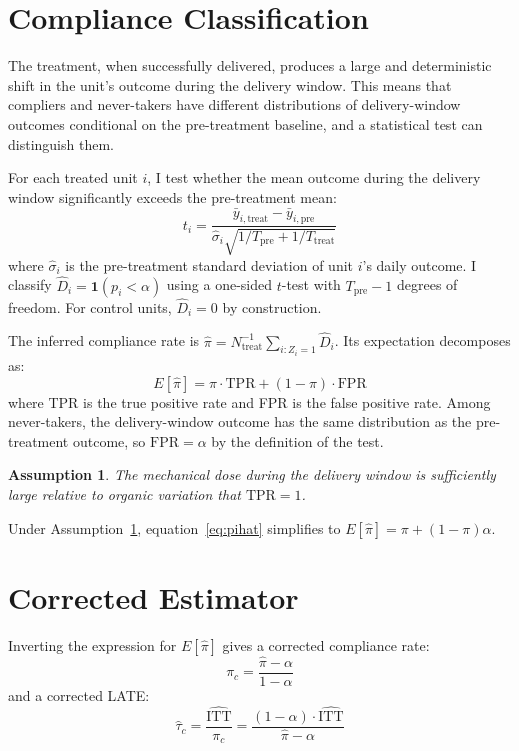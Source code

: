 \documentclass[12pt]{article}
\newtheorem{assumption}{Assumption}
\begin{document}
\section{Compliance Classification}

The treatment, when successfully delivered, produces a large and deterministic shift in the unit's outcome during the delivery window. This means that compliers and never-takers have different distributions of delivery-window outcomes conditional on the pre-treatment baseline, and a statistical test can distinguish them.

For each treated unit $i$, I test whether the mean outcome during the delivery window significantly exceeds the pre-treatment mean:
\begin{equation}\label{eq:tstat}
t_i = \frac{\bar{y}_{i,\text{treat}} - \bar{y}_{i,\text{pre}}}{\hat{\sigma}_i \sqrt{1/T_{\text{pre}} + 1/T_{\text{treat}}}}
\end{equation}
where $\hat{\sigma}_i$ is the pre-treatment standard deviation of unit $i$'s daily outcome. I classify $\hat{D}_i = \mathbf{1}(p_i < \alpha)$ using a one-sided $t$-test with $T_{\text{pre}} - 1$ degrees of freedom. For control units, $\hat{D}_i = 0$ by construction.

The inferred compliance rate is $\hat{\pi} = N_{\text{treat}}^{-1} \sum_{i: Z_i=1} \hat{D}_i$. Its expectation decomposes as:
\begin{equation}\label{eq:pihat}
E[\hat{\pi}] = \pi \cdot \text{TPR} + (1 - \pi) \cdot \text{FPR}
\end{equation}
where TPR is the true positive rate and FPR is the false positive rate. Among never-takers, the delivery-window outcome has the same distribution as the pre-treatment outcome, so $\text{FPR} = \alpha$ by the definition of the test.

\begin{assumption}\label{as:tpr}
The mechanical dose during the delivery window is sufficiently large relative to organic variation that $\text{TPR} = 1$.
\end{assumption}

Under Assumption~\ref{as:tpr}, equation~\eqref{eq:pihat} simplifies to $E[\hat{\pi}] = \pi + (1-\pi)\alpha$.

\section{Corrected Estimator}

Inverting the expression for $E[\hat{\pi}]$ gives a corrected compliance rate:
\begin{equation}\label{eq:picorr}
\pi_c = \frac{\hat{\pi} - \alpha}{1 - \alpha}
\end{equation}
and a corrected LATE:
\begin{equation}\label{eq:latecorr}
\hat{\tau}_c = \frac{\widehat{\text{ITT}}}{\pi_c} = \frac{(1 - \alpha) \cdot \widehat{\text{ITT}}}{\hat{\pi} - \alpha}
\end{equation}
\end{document}
